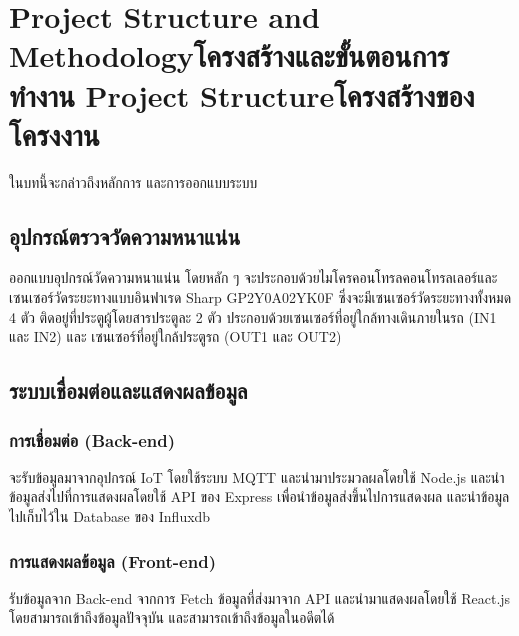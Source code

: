 \chapter{\ifproject%
\ifenglish Project Structure and Methodology\else โครงสร้างและขั้นตอนการทำงาน\fi
\else%
\ifenglish Project Structure\else โครงสร้างของโครงงาน\fi
\fi
}

ในบทนี้จะกล่าวถึงหลักการ และการออกแบบระบบ

\section{อุปกรณ์ตรวจวัดความหนาแน่น}
ออกแบบอุปกรณ์วัดความหนาแน่น โดยหลัก ๆ จะประกอบด้วยไมโครคอนโทรลคอนโทรลเลอร์และเซนเซอร์วัดระยะทางแบบอินฟาเรด Sharp GP2Y0A02YK0F ซึ่งจะมีเซนเซอร์วัดระยะทางทั้งหมด 4 ตัว ติดอยู่ที่ประตูผู้โดยสารประตูละ 2 ตัว ประกอบด้วยเซนเซอร์ที่อยู่ใกล้ทางเดินภายในรถ (IN1 และ IN2) และ เซนเซอร์ที่อยู่ใกล้ประตูรถ (OUT1 และ OUT2) 


\section{ระบบเชื่อมต่อและแสดงผลข้อมูล}

\subsection{การเชื่อมต่อ (Back-end)}
จะรับข้อมูลมาจากอุปกรณ์ IoT โดยใช้ระบบ MQTT และนำมาประมวลผลโดยใช้ Node.js และนำข้อมูลส่งไปที่การแสดงผลโดยใช้ API ของ Express เพื่อนำข้อมูลส่งขึ้นไปการแสดงผล และนำข้อมูลไปเก็บไว้ใน Database ของ Influxdb

\subsection{การแสดงผลข้อมูล (Front-end)}
รับข้อมูลจาก Back-end จากการ Fetch ข้อมูลที่ส่งมาจาก API และนำมาแสดงผลโดยใช้ React.js โดยสามารถเข้าถึงข้อมูลปัจจุบัน และสามารถเข้าถึงข้อมูลในอดีตได้


